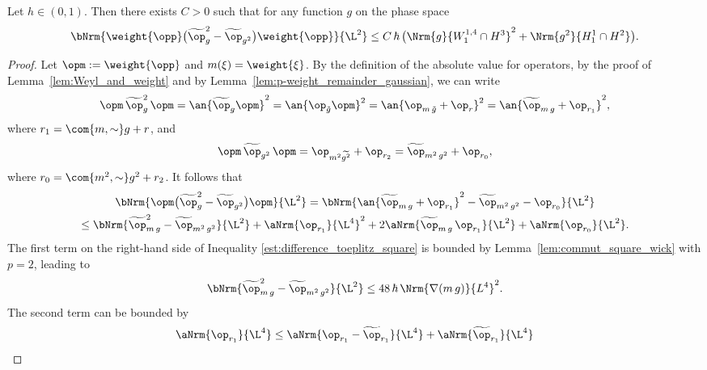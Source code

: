 \begin{lem}\label{lem:init_diff_diag}
Let $h\in(0,1)$. Then there exists $C>0$ such that for any function $g$ on the phase space
\begin{equation*}
\bNrm{\weight{\opp}\bigl(\widetilde{\op}_{g}^2 - \widetilde{\op}_{g^2}\bigr) \weight{\opp}}{\L^2} \leq C\,\hbar\, \bigl(\Nrm{g}{W^{1,4}_1\cap H^3}^2 + \Nrm{g^2}{H^1_1\cap H^2}\bigr).
\end{equation*}
\end{lem}

\begin{proof}
Let $\opm := \weight{\opp}$ and $m(\xi) = \weight{\xi}$. By the definition of the absolute value for operators, by the proof of Lemma~\ref{lem:Weyl_and_weight} and by Lemma~\ref{lem:p-weight_remainder_gaussian}, we can write
\begin{equation*}
\opm\,\widetilde{\op}_{g}^2\,\opm = \an{\widetilde{\op}_{g} \opm}^2 = \an{\op_{\tilde{g}} \opm}^2 = \an{\op_{m\,\tilde{g}} + \op_r}^2 = \an{\widetilde{\op}_{m\,g} + \op_{r_1}}^2,
\end{equation*}
where $r_1 = \com{m,\sim}g+r$, and
\begin{equation*}
\opm\,\widetilde{\op}_{g^2}\,\opm = \op_{m^2\widetilde{g^2}} + \op_{r_2} = \widetilde{\op}_{m^2\,g^2} + \op_{r_0},
\end{equation*}
where $r_0 = \com{m^2,\sim}g^2+r_2$. It follows that
\begin{multline}\label{est:difference_toeplitz_square}
\bNrm{\opm\big(\widetilde{\op}_{g}^2 - \widetilde{\op}_{g^2}\big)\opm}{\L^2} = \bNrm{\an{\widetilde{\op}_{m\,g} +\op_{r_1}}^2 - \widetilde{\op}_{m^2\,g^2} - \op_{r_0}}{\L^2}
\\
\leq \bNrm{\widetilde{\op}_{m\,g}^2 - \widetilde{\op}_{m^2\,g^2}}{\L^2} + \aNrm{\op_{r_1}}{\L^4}^2 + 2 \aNrm{\widetilde{\op}_{m\,g}\, \op_{r_1}}{\L^2} + \aNrm{\op_{r_0}}{\L^2}.
\end{multline}
The first term on the right-hand side of Inequality \eqref{est:difference_toeplitz_square} is bounded by Lemma~\ref{lem:commut_square_wick} with $p=2$, leading to
\begin{equation*}
\bNrm{\widetilde{\op}_{m\,g}^2 - \widetilde{\op}_{m^2\,g^2}}{\L^2} \leq 48\,\hbar\, {\Nrm{\nabla(m\,g)}{L^4}^2}.
\end{equation*}
The second term can be bounded by
\begin{equation*}
\aNrm{\op_{r_1}}{\L^4} \leq \aNrm{\op_{r_1} - \widetilde{\op}_{r_1}}{\L^4} +\aNrm{\widetilde{\op}_{r_1}}{\L^4}
\end{equation*}

\end{proof}
